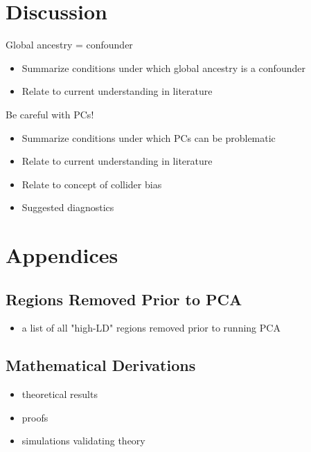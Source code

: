 \documentclass[12pt]{article}
\begin{document}
\section{Discussion}


Global ancestry = confounder
\begin{itemize}
\item Summarize conditions under which global ancestry is a confounder 
\item Relate to current understanding in literature
\end{itemize}

\noindent Be careful with PCs!
\begin{itemize}
\item Summarize conditions under which PCs can be problematic
\item Relate to current understanding in literature
\item Relate to concept of collider bias
\item Suggested diagnostics
\end{itemize}





\newpage
\section{Appendices}


\subsection{Regions Removed Prior to PCA}

\begin{itemize}
\item a list of all "high-LD" regions removed prior to running PCA
\end{itemize}

\subsection{Mathematical Derivations}

\begin{itemize}
\item theoretical results
\item proofs
\item simulations validating theory
\end{itemize}
\end{document}
